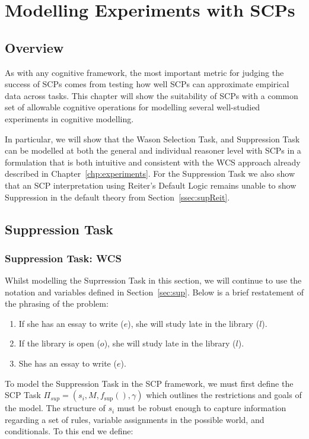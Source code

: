 \chapter{Modelling Experiments with SCPs} \label{chp:model}
\section{Overview}
As with any cognitive framework, the most important metric for judging the success of SCPs comes from testing how well SCPs can approximate empirical data across tasks. This chapter will show the suitability of SCPs with a common set of allowable cognitive operations for modelling several well-studied experiments in cognitive modelling.

In particular, we will show that the Wason Selection Task, and Suppression Task can be modelled at both the general and individual reasoner level with SCPs in a formulation that is both intuitive and consistent with the WCS approach already described in Chapter~\ref{chp:experiments}. For the Suppression Task we also show that an SCP interpretation using Reiter's Default Logic remains unable to show Suppression in the default theory from Section~\ref{ssec:supReit}.

\section{Suppression Task} \label{sec:supSCP}

\subsection{Suppression Task: WCS}
Whilst modelling the Suprression Task in this section, we will continue to use the notation and variables defined in Section~\ref{sec:sup}. Below is a brief restatement of the phrasing of the problem:

\begin{enumerate}
\item If she has an essay to write ($e$), she will study late in the library ($l$).
\item If the library is open ($o$), she will study late in the library ($l$).
\item She has an essay to write ($e$).
\end{enumerate}

To model the Suppression Task in the SCP framework, we must first define the SCP Task $\Pi_{sup}=(s_i,M,f_\text{sup}(),\gamma)$ which outlines the restrictions and goals of the model. The structure of $s_i$ must be robust enough to capture information regarding a set of rules, variable assignments in the possible world, and conditionals. To this end we define:

